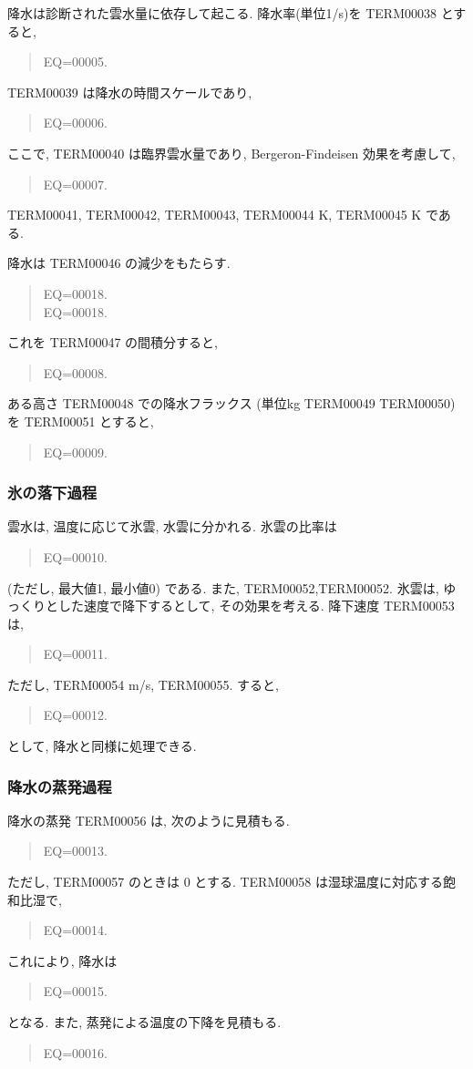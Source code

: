 降水は診断された雲水量に依存して起こる.
降水率(単位1/s)を TERM00038 とすると,
\begin{quote}
EQ=00005.
\end{quote}

TERM00039 は降水の時間スケールであり,
\begin{quote}
EQ=00006.
\end{quote}
ここで, TERM00040 は臨界雲水量であり,
Bergeron-Findeisen 効果を考慮して,
\begin{quote}
EQ=00007.
\end{quote}
TERM00041, TERM00042, TERM00043, 
TERM00044 K, TERM00045 K である.

降水は TERM00046 の減少をもたらす.
\begin{quote}
EQ=00018.\\
EQ=00018.
\end{quote}
これを TERM00047 の間積分すると,
\begin{quote}
EQ=00008.
\end{quote}

ある高さ TERM00048 での降水フラックス
(単位kg TERM00049 TERM00050)を TERM00051 とすると,
\begin{quote}
EQ=00009.
\end{quote}

\subsubsection{氷の落下過程}

雲水は, 温度に応じて氷雲, 水雲に分かれる.
氷雲の比率は
\begin{quote}
EQ=00010.
\end{quote}
(ただし, 最大値1, 最小値0) である. また,
TERM00052,TERM00052.
氷雲は, ゆっくりとした速度で降下するとして, 
その効果を考える. 降下速度 TERM00053 は,
\begin{quote}
EQ=00011.
\end{quote}
ただし, TERM00054 m/s, TERM00055.
すると, 
\begin{quote}
EQ=00012.
\end{quote}
として, 降水と同様に処理できる.

\subsubsection{降水の蒸発過程}

降水の蒸発 TERM00056 は, 次のように見積もる.

\begin{quote}
EQ=00013.
\end{quote}
ただし, TERM00057 のときは 0 とする.
TERM00058 は湿球温度に対応する飽和比湿で,
\begin{quote}
EQ=00014.
\end{quote}
%
これにより, 降水は
\begin{quote}
EQ=00015.
\end{quote}
となる. また, 蒸発による温度の下降を見積もる.
\begin{quote}
EQ=00016.
\end{quote}

